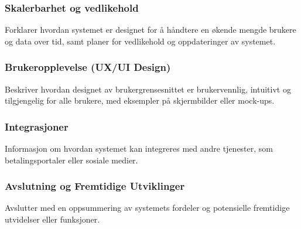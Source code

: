 \documentclass[../doc.tex]{subfiles}
\begin{document}
\subsubsection*{Skalerbarhet og vedlikehold}
Forklarer hvordan systemet er designet for å håndtere en økende mengde brukere og data over tid, samt planer for vedlikehold og oppdateringer av systemet.

\subsubsection*{Brukeropplevelse (UX/UI Design)}
Beskriver hvordan designet av brukergrensesnittet er brukervennlig, intuitivt og tilgjengelig for alle brukere, med eksempler på skjermbilder eller mock-ups.

\subsubsection*{Integrasjoner}
Informasjon om hvordan systemet kan integreres med andre tjenester, som betalingsportaler eller sosiale medier.

\subsubsection*{Avslutning og Fremtidige Utviklinger}
Avslutter med en oppsummering av systemets fordeler og potensielle fremtidige utvidelser eller funksjoner.
\end{document}
